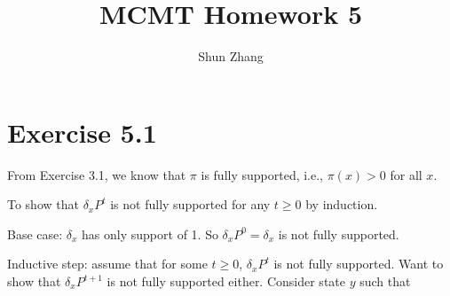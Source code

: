 \documentclass[10pt]{article}
\title{MCMT Homework 5}
\author{Shun Zhang}
\date{}
\begin{document}
\maketitle

\section*{Exercise 5.1}

From Exercise 3.1, we know that $\pi$ is fully supported, i.e., $\pi(x) > 0$
for all $x$.

To show that $\delta_x P^t$ is not fully supported for any $t \geq 0$ by
induction.

Base case: $\delta_x$ has only support of 1. So $\delta_x P^0 = \delta_x$ is not
fully supported.

Inductive step: assume that for some $t \geq 0$, $\delta_x P^t$ is not fully
supported. Want to show that $\delta_x P^{t+1}$ is not fully supported either.
Consider state $y$ such that
\end{document}
